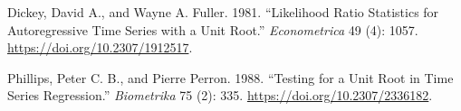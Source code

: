 \documentclass[11pt,]{article}
\begin{document}
\setlength{\parindent}{-0.2in}
\setlength{\leftskip}{0.2in}
\setlength{\parskip}{8pt}
\vspace*{-0.2in}

\noindent

\hypertarget{refs}{}
\leavevmode\hypertarget{ref-Dickey1981}{}%
Dickey, David A., and Wayne A. Fuller. 1981. ``Likelihood Ratio
Statistics for Autoregressive Time Series with a Unit Root.''
\emph{Econometrica} 49 (4): 1057. \url{https://doi.org/10.2307/1912517}.

\leavevmode\hypertarget{ref-Phillips1988}{}%
Phillips, Peter C. B., and Pierre Perron. 1988. ``Testing for a Unit
Root in Time Series Regression.'' \emph{Biometrika} 75 (2): 335.
\url{https://doi.org/10.2307/2336182}.




\newpage
\singlespacing 
\end{document}
